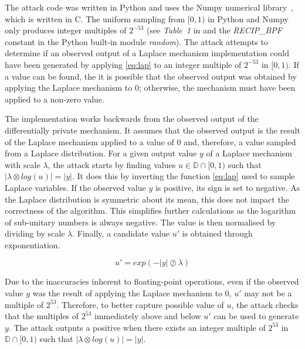 \documentclass[orivec,envcountsame]{llncs}
\begin{document}
The attack code was written in Python and uses the Numpy numerical library~\cite{harris2020array}, which is written in C. The uniform sampling from $[0, 1)$ in Python and Numpy only produces integer multiples of $2^{-53}$ (see \textit{Table~1} in \cite{mironov2012significance} and the \textit{RECIP\_BPF} constant in the Python built-in module \textit{random}). The attack attempts to determine if an observed output of a Laplace mechanism implementation could have been generated by applying \ref{eq:lap} to an integer multiple of $2^{-53}$ in $[0, 1)$. If a value can be found, the it is possible that the observed output was obtained by applying the Laplace mechanism to $0$; otherwise, the mechanism must have been applied to a non-zero value.

The implementation works backwards from the observed output of the differentially private mechanism. It assumes that the observed output is the result of the Laplace mechanism applied to a value of 0 and, therefore, a value sampled from a Laplace distribution. For a given output value $y$ of a Laplace mechanism with scale $\lambda$, the attack starts by finding values $ u \in \mathbb{D} \cap [0, 1)$ such that $|\lambda \otimes log(u)| = |y|$. It does this by inverting the function \ref{eq:lap} used to sample Laplace variables. If the observed value $y$ is positive, its sign is set to negative. As the Laplace distribution is symmetric about its mean, this does not impact the correctness of the algorithm. This simplifies further calculations as the logarithm of sub-unitary numbers is always negative. The value is then normalised by dividing by scale $\lambda$. Finally, a candidate value $u'$ is obtained through exponentiation.

$$u' = exp(-|y| \oslash \lambda)$$

Due to the inaccuracies inherent to floating-point operations, even if the observed value $y$ was the result of applying the Laplace mechanism to $0$, $u'$ may not be a multiple of $2^{53}$. Therefore, to better capture possible value of $u$, the attack checks that the multiples of $2^{53}$ immediately above and below $u'$ can be used to generate $y$. The attack outputs a positive when there exists an integer multiple of $2^{53}$ in $\mathbb{D} \cap [0, 1)$ such that $|\lambda \otimes log(u)| = |y|$.
\end{document}
